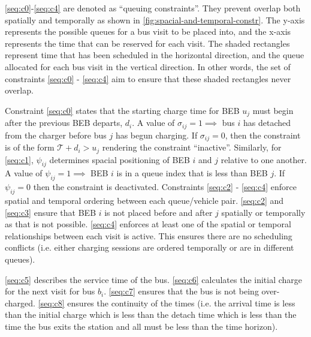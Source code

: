 \documentclass[energies,article,submit,moreauthors]{Definitions/mdpi}
\newcommand{\T}{\mathcal{T}}                %
\begin{document}
\ref{seq:c0}-\ref{seq:c4} are denoted as ``queuing constraints''. They prevent overlap both spatially and temporally as
shown in \ref{fig:spacial-and-temporal-constr}. The y-axis represents the possible queues for a bus visit to be placed into, and the x-axis
represents the time that can be reserved for each visit. The shaded rectangles represent time that has been scheduled in
the horizontal direction, and the queue allocated for each bus visit in the vertical direction. In other words, the set
of constraints \ref{seq:c0} - \ref{seq:c4} aim to ensure that these shaded rectangles never overlap.

Constraint \ref{seq:c0} states that the starting charge time for BEB \(u_j\) must begin after the previous BEB departs,
\(d_i\). A value of \(\sigma_{ij} = 1 \implies\) bus \(i\) has detached from the charger before bus \(j\) has begun charging. If
\(\sigma_{ij} = 0\), then the constraint is of the form \(\T + d_i > u_j\) rendering the constraint ``inactive''. Similarly, for
\ref{seq:c1}, \(\psi_{ij}\) determines spacial positioning of BEB \(i\) and \(j\) relative to one another. A value of \(\psi_{ij} = 1
\implies\) BEB \(i\) is in a queue index that is less than BEB \(j\). If \(\psi_{ij} = 0\) then the constraint is deactivated.
Constraints \ref{seq:c2} - \ref{seq:c4} enforce spatial and temporal ordering between each queue/vehicle pair.
\ref{seq:c2} and \ref{seq:c3} ensure that BEB \(i\) is not placed before and after \(j\) spatially or temporally as that is
not possible. \ref{seq:c4} enforces at least one of the spatial or temporal relationships between each visit is active.
This ensures there are no scheduling conflicts (i.e. either charging sessions are ordered temporally or are in different
queues).

\ref{seq:c5} describes the service time of the bus. \ref{seq:c6} calculates the initial charge for the next visit for
bus \(b_i\). \ref{seq:c7} ensures that the bus is not being over-charged. \ref{seq:c8} ensures the continuity of the times
(i.e. the arrival time is less than the initial charge which is less than the detach time which is less than the time
the bus exits the station and all must be less than the time horizon).
\end{document}
